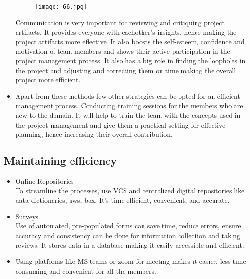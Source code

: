 \documentclass[a4paper,12pt]{article}
\begin{document}
\begin{itemize}
\begin{itemize}
\end{itemize}

\begin{figure}[h!]
      \raggedleft
      \texttt{[image: 66.jpg]} 
    \end{figure}



Communication is very important for reviewing and critiquing project artifacts. It provides everyone with eachother’s insights, hence making the project artifacts more effective. It also boosts the self-esteem, confidence and motivation of team members and shows their active participation in the project management process. It also has a big role in finding the loopholes in the project and adjusting and correcting them on time making the overall project more efficient.

\item Apart from these methods few other strategies can be opted for an efficient management process. Conducting training sessions for the members who are new to the domain. It will help to train the team with the concepts used in the project management and give them a practical setting for effective planning, hence increasing their overall contribution.
\end{itemize}

\subsection{Maintaining efficiency}

\begin{itemize}


\item Online Repositories
\\To streamline the processes, use VCS and centralized digital repositories like data dictionaries, aws, box. It's time efficient, convenient, and accurate.

\item Surveys 
\\Use of automated, pre-populated forms can save time, reduce errors, ensure accuracy and consistency can be done for information collection and taking reviews. It stores data in a database making it easily accessible and efficient.

\item Using platforms like MS teams or zoom for meeting makes it easier, less-time consuming and convenient for all the members.

\end{itemize}
\end{document}
